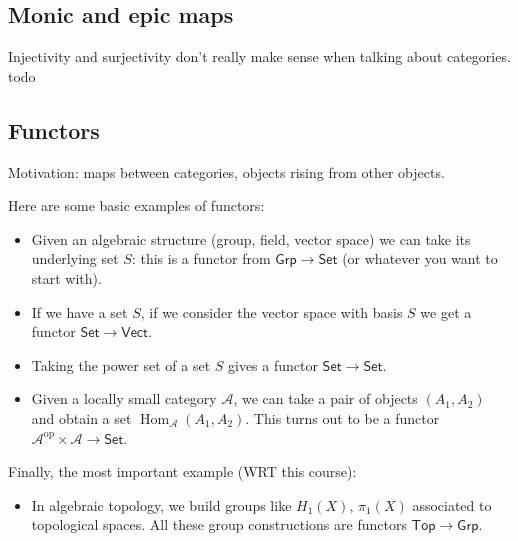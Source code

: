 \subsection{Monic and epic maps}
Injectivity and surjectivity don't really make sense when talking about categories. todo


\subsection{Functors}
Motivation: maps between categories, objects rising from other objects. 
\begin{example}
   Here are some basic examples of functors:
   \begin{itemize}
       \item Given an algebraic structure (group, field, vector space) we can take its underlying set $S$: this is a functor from $\mathsf{Grp}\to \mathsf{Set}$ (or whatever you want to start with).
       \item If we have a set $S$, if we consider the vector space with basis $S$ we get a functor $\mathsf{Set} \to \mathsf{Vect}$.
       \item Taking the power set of a set $S$ gives a functor $\mathsf{Set}\to \mathsf{Set}$.
       \item Given a locally small category $\mathcal{A}$, we can take a pair of objects $(A_1,A_2)$ and obtain a set $\operatorname{Hom}_{\mathcal{A}}(A_1,A_2)$. This turns out to be a functor $\mathcal{A}^{\text{op}}\times \mathcal{A}\to \mathsf{Set}$.
   \end{itemize}
   Finally, the most important example (WRT this course):
   \begin{itemize}
       \item In algebraic topology, we build groups like $H_1(X),\, \pi_1(X)$ associated to topological spaces. All these group constructions are functors $\mathsf{Top} \to \mathsf{Grp}$.
   \end{itemize}
\end{example}
